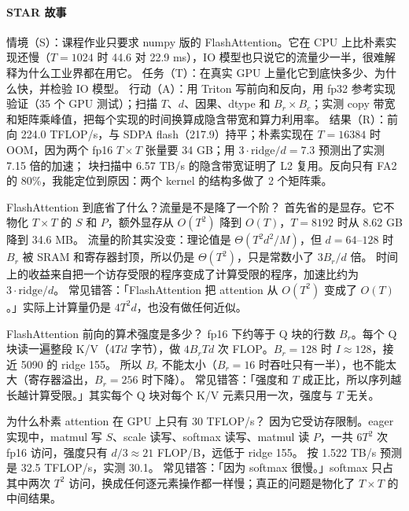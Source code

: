 \documentclass[11pt,a4paper]{ctexart}
\begin{document}
\paragraph{STAR 故事}
情境（S）：课程作业只要求 numpy 版的 FlashAttention。它在 CPU 上比朴素实现还慢（$T=1024$ 时 44.6 对 22.9 ms），IO 模型也只说它的流量少一半，很难解释为什么工业界都在用它。
任务（T）：在真实 GPU 上量化它到底快多少、为什么快，并检验 IO 模型。
行动（A）：用 Triton 写前向和反向，用 fp32 参考实现验证（35 个 GPU 测试）；扫描 $T$、$d$、因果、dtype 和 $B_r\times B_c$；实测 copy 带宽和矩阵乘峰值，把每个实现的时间换算成隐含带宽和算力利用率。
结果（R）：前向 224.0 TFLOP/s，与 SDPA flash（217.9）持平；朴素实现在 $T=16384$ 时 OOM，因为两个 fp16 $T\times T$ 张量要 34 GB；用 $3\cdot\text{ridge}/d=7.3$ 预测出了实测 7.15 倍的加速；
块扫描中 6.57 TB/s 的隐含带宽证明了 L2 复用。反向只有 FA2 的 80\%，我能定位到原因：两个 kernel 的结构多做了 2 个矩阵乘。

\begin{iqbox}{FlashAttention 到底省了什么？流量是不是降了一个阶？}
首先省的是显存。它不物化 $T\times T$ 的 $S$ 和 $P$，额外显存从 $O(T^2)$ 降到 $O(T)$，$T=8192$ 时从 8.62 GB 降到 34.6 MB。
流量的阶其实没变：理论值是 $\Theta(T^2d^2/M)$，但 $d=64$–$128$ 时 $B_r$ 被 SRAM 和寄存器封顶，所以仍是 $\Theta(T^2)$，只是常数小了 $3B_r/d$ 倍。
时间上的收益来自把一个访存受限的程序变成了计算受限的程序，加速比约为 $3\cdot\text{ridge}/d$。
\tcblower
常见错答：「FlashAttention 把 attention 从 $O(T^2)$ 变成了 $O(T)$。」实际上计算量仍是 $4T^2d$，也没有做任何近似。
\end{iqbox}

\begin{iqbox}{FlashAttention 前向的算术强度是多少？}
fp16 下约等于 Q 块的行数 $B_r$。每个 Q 块读一遍整段 K/V（$4Td$ 字节），做 $4B_rTd$ 次 FLOP。$B_r=128$ 时 $I\approx128$，接近 5090 的 ridge 155。
所以 $B_r$ 不能太小（$B_r=16$ 时吞吐只有一半），也不能太大（寄存器溢出，$B_r=256$ 时下降）。
\tcblower
常见错答：「强度和 $T$ 成正比，所以序列越长越计算受限。」其实每个 Q 块对每个 K/V 元素只用一次，强度与 $T$ 无关。
\end{iqbox}

\begin{iqbox}{为什么朴素 attention 在 GPU 上只有 30 TFLOP/s？}
因为它受访存限制。eager 实现中，matmul 写 $S$、scale 读写、softmax 读写、matmul 读 $P$，一共 $6T^2$ 次 fp16 访问，强度只有 $d/3\approx21$ FLOP/B，远低于 ridge 155。
按 1.522 TB/s 预测是 32.5 TFLOP/s，实测 30.1。
\tcblower
常见错答：「因为 softmax 很慢。」softmax 只占其中两次 $T^2$ 访问，换成任何逐元素操作都一样慢；真正的问题是物化了 $T\times T$ 的中间结果。
\end{iqbox}
\end{document}
